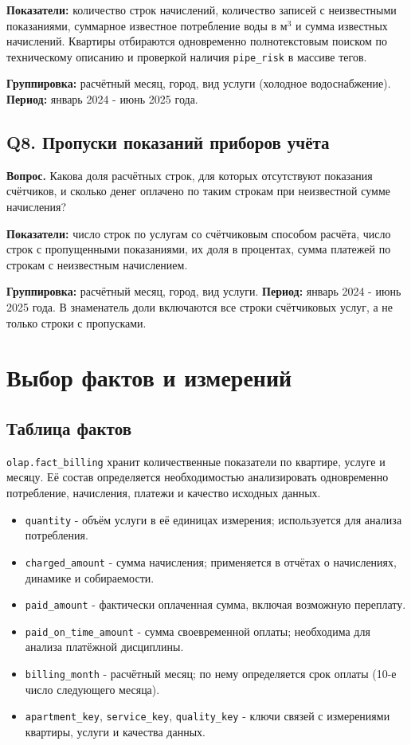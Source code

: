 \documentclass[12pt]{article}
\begin{document}
\textbf{Показатели:} количество строк начислений, количество записей с неизвестными показаниями, суммарное известное потребление воды в м$^3$ и сумма известных начислений. Квартиры отбираются одновременно полнотекстовым поиском по техническому описанию и проверкой наличия \texttt{pipe\_risk} в массиве тегов.

\textbf{Группировка:} расчётный месяц, город, вид услуги (холодное водоснабжение). \textbf{Период:} январь 2024 - июнь 2025 года.

\subsection{Q8. Пропуски показаний приборов учёта}
\textbf{Вопрос.} Какова доля расчётных строк, для которых отсутствуют показания счётчиков, и сколько денег оплачено по таким строкам при неизвестной сумме начисления?

\textbf{Показатели:} число строк по услугам со счётчиковым способом расчёта, число строк с пропущенными показаниями, их доля в процентах, сумма платежей по строкам с неизвестным начислением.

\textbf{Группировка:} расчётный месяц, город, вид услуги. \textbf{Период:} январь 2024 - июнь 2025 года. В знаменатель доли включаются все строки счётчиковых услуг, а не только строки с пропусками.

\section{Выбор фактов и измерений}
\subsection{Таблица фактов}
\texttt{olap.fact\_billing} хранит количественные показатели по квартире, услуге и месяцу. Её состав определяется необходимостью анализировать одновременно потребление, начисления, платежи и качество исходных данных.

\begin{itemize}
    \item \texttt{quantity} - объём услуги в её единицах измерения; используется для анализа потребления.
    \item \texttt{charged\_amount} - сумма начисления; применяется в отчётах о начислениях, динамике и собираемости.
    \item \texttt{paid\_amount} - фактически оплаченная сумма, включая возможную переплату.
    \item \texttt{paid\_on\_time\_amount} - сумма своевременной оплаты; необходима для анализа платёжной дисциплины.
    \item \texttt{billing\_month} - расчётный месяц; по нему определяется срок оплаты (10-е число следующего месяца).
    \item \texttt{apartment\_key}, \texttt{service\_key}, \texttt{quality\_key} - ключи связей с измерениями квартиры, услуги и качества данных.
\end{itemize}
\end{document}
